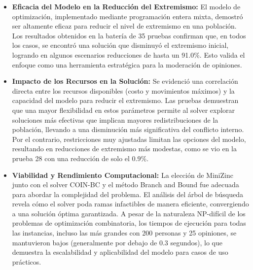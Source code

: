 \documentclass[11pt,letter]{article}
\begin{document}
\begin{itemize}
    \item \textbf{Eficacia del Modelo en la Reducción del Extremismo:} El modelo de optimización, implementado mediante programación entera mixta, demostró ser altamente eficaz para reducir el nivel de extremismo en una población. Los resultados obtenidos en la batería de 35 pruebas confirman que, en todos los casos, se encontró una solución que disminuyó el extremismo inicial, logrando en algunos escenarios reducciones de hasta un 91.0\%. Esto valida el enfoque como una herramienta estratégica para la moderación de opiniones.


    \item \textbf{Impacto de los Recursos en la Solución:} Se evidenció una correlación directa entre los recursos disponibles (costo y movimientos máximos) y la capacidad del modelo para reducir el extremismo. Las pruebas demuestran que una mayor flexibilidad en estos parámetros permite al solver explorar soluciones más efectivas que implican mayores redistribuciones de la población, llevando a una disminución más significativa del conflicto interno. Por el contrario, restricciones muy ajustadas limitan las opciones del modelo, resultando en reducciones de extremismo más modestas, como se vio en la prueba 28 con una reducción de solo el 0.9\%.

    \item \textbf{Viabilidad y Rendimiento Computacional:} La elección de MiniZinc junto con el solver COIN-BC y el método Branch and Bound fue adecuada para abordar la complejidad del problema. El análisis del árbol de búsqueda revela cómo el solver poda ramas infactibles de manera eficiente, convergiendo a una solución óptima garantizada. A pesar de la naturaleza NP-difícil de los problemas de optimización combinatoria, los tiempos de ejecución para todas las instancias, incluso las más grandes con 200 personas y 25 opiniones, se mantuvieron bajos (generalmente por debajo de 0.3 segundos), lo que demuestra la escalabilidad y aplicabilidad del modelo para casos de uso prácticos.
\end{itemize}

\newpage
\nocite{*}
\printbibliography
\end{document}
